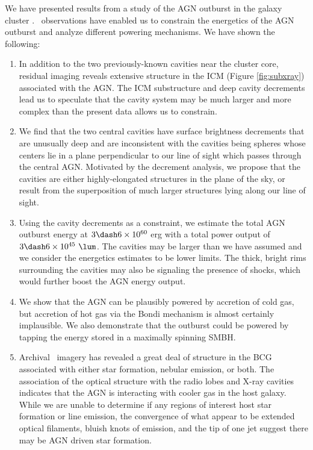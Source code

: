 \documentclass[apjpt4]{aastex}
\begin{document}
We have presented results from a study of the AGN outburst in the
galaxy cluster \rbs. \cxo\ observations have enabled us to constrain
the energetics of the AGN outburst and analyze different powering
mechanisms. We have shown the following:
\begin{enumerate}
\item In addition to the two previously-known cavities near the
  cluster core, residual imaging reveals extensive structure in the
  ICM (Figure \ref{fig:subxray}) associated with the AGN. The ICM
  substructure and deep cavity decrements lead us to speculate that
  the cavity system may be much larger and more complex than the
  present data allows us to constrain.
\item We find that the two central cavities have surface brightness
  decrements that are unusually deep and are inconsistent with the
  cavities being spheres whose centers lie in a plane perpendicular to
  our line of sight which passes through the central AGN. Motivated by
  the decrement analysis, we propose that the cavities are either
  highly-elongated structures in the plane of the sky, or result from
  the superposition of much larger structures lying along our line of
  sight.
\item Using the cavity decrements as a constraint, we estimate the
  total AGN outburst energy at $3 \dash 6 \times 10^{60}$ erg with a
  total power output of $3 \dash 6 \times 10^{45} ~\lum$. The cavities
  may be larger than we have assumed and we consider the energetics
  estimates to be lower limits. The thick, bright rims surrounding the
  cavities may also be signaling the presence of shocks, which would
  further boost the AGN energy output.
\item We show that the AGN can be plausibly powered by accretion of
  cold gas, but accretion of hot gas via the Bondi mechanism is almost
  certainly implausible. We also demonstrate that the outburst could
  be powered by tapping the energy stored in a maximally spinning
  SMBH.
\item Archival \hst\ imagery has revealed a great deal of structure in
  the BCG associated with either star formation, nebular emission, or
  both. The association of the optical structure with the radio lobes
  and X-ray cavities indicates that the AGN is interacting with cooler
  gas in the host galaxy. While we are unable to determine if any
  regions of interest host star formation or line emission, the
  convergence of what appear to be extended optical filaments, bluish
  knots of emission, and the tip of one jet suggest there may be AGN
  driven star formation.
\end{enumerate}
\end{document}
